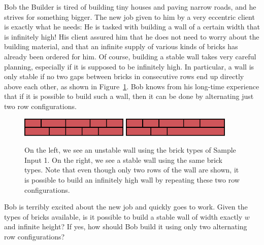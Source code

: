 \problemname{\problemyamlname}
Bob the Builder is tired of building tiny houses and paving narrow roads, and he strives for something bigger.
The new job given to him by a very eccentric client is exactly what he needs:
He is tasked with building a wall of a certain width that is infinitely high!
His client assured him that he does not need to worry about the building material, and that an infinite supply of various kinds of bricks has already been ordered for him.
Of course, building a stable wall takes very careful planning, especially if it is supposed to be infinitely high. 
In particular, a wall is only stable if no two gaps between bricks in consecutive rows end up directly above each other, as shown in Figure~\ref{fig:bricks}.
Bob knows from his long-time experience that if it is possible to build such a wall, then it can be done by alternating just two row configurations.


\begin{figure}[h]
  \includegraphics[width=0.46\textwidth]{sample_wa}
  \hfill
  \includegraphics[width=0.46\textwidth]{sample}
  \caption{On the left, we see an unstable wall using the brick types of Sample Input 1.
    On the right, we see a stable wall using the same brick types.
    Note that even though only two rows of the wall are shown, it is possible to build an infinitely high wall by repeating these two row configurations.}
    \label{fig:bricks}
\end{figure}

Bob is terribly excited about the new job and quickly goes to work.
Given the types of bricks available, is it possible to build a stable wall of
width exactly $w$ and infinite height?
If yes, how should Bob build it using only two alternating row configurations?

